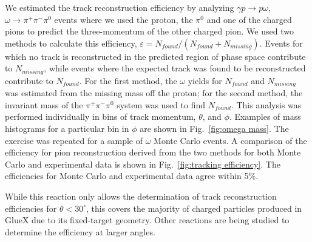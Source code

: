 We estimated the track reconstruction efficiency by analyzing $\gamma p \rightarrow p \omega$, $\omega\rightarrow\pi^+\pi^-\pi^0$ events where we used the proton, the $\pi^0$ and one of the charged pions to predict the three-momentum of the other charged pion. We used two methods to calculate this efficiency, $\varepsilon=N_{found}/(N_{found}+N_{missing})$.  Events for which no track is reconstructed in the predicted region of 
phase space contribute to $N_{missing}$, while events where the expected track was found to be reconstructed contribute to $N_{found}$.  For the first method, the $\omega$ yields for $N_{found}$ and $N_{missing}$ was estimated from the missing mass off the 
proton; for the second method, the invariant mass of the $\pi^+\pi^-\pi^0$ system was used to find $N_{found}$.  This analysis was performed individually in bins of track momentum, $\theta$, and $\phi$.
Examples of mass histograms for a particular bin in $\phi$ are shown in Fig.~\ref{fig:omega mass}.  The exercise was repeated for a sample of $\omega$ Monte Carlo events.   A comparison of the efficiency for pion reconstruction derived from the 
two methods for both Monte Carlo and experimental data is shown in Fig.~\ref{fig:tracking efficiency}.  The efficiencies for Monte Carlo and experimental data 
agree within 5\%.

While this reaction only allows the determination of track reconstruction efficiencies for $\theta < 30^\circ$, this covers the majority of charged particles produced in GlueX due to its fixed-target geometry.  Other reactions are being studied to determine the efficiency at larger angles.

